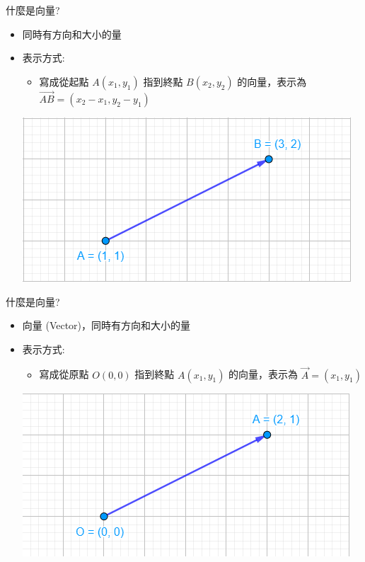 \documentclass[aspectratio=169]{beamer}
\begin{document}
\begin{frame}{什麼是向量?}
    \begin{itemize}
        \item 同時有方向和大小的量
        \item 表示方式:
        \begin{itemize}
            \item 寫成從起點 $A(x_1,y_1)$ 指到終點 $B(x_2,y_2)$ 的向量，表示為 $\overrightarrow{AB} = (x_2-x_1,y_2-y_1)$
        \end{itemize}
        \begin{center}
            \includegraphics[scale=0.5]{images/Two Points Form.png}
        \end{center}
    \end{itemize}
\end{frame}

\begin{frame}{什麼是向量?}
    \begin{itemize}
        \item 向量 (Vector)，同時有方向和大小的量
        \item 表示方式:
        \begin{itemize}
            \item 寫成從原點 $O(0,0)$ 指到終點 $A(x_1,y_1)$ 的向量，表示為 $\overrightarrow{A} = (x_1,y_1)$
        \end{itemize}
        \begin{center}
            \includegraphics[scale=0.5]{images/vector_from_O.png}
        \end{center}
    \end{itemize}
\end{frame}
\end{document}
